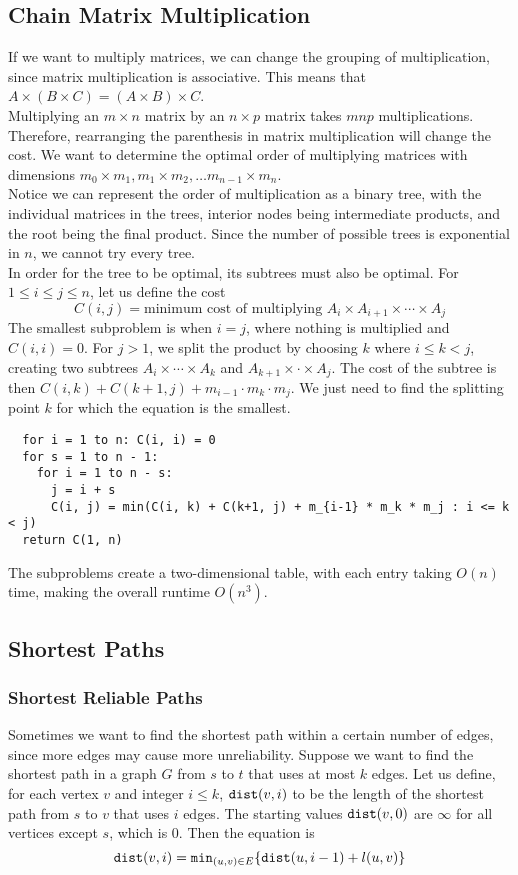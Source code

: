 \subsection{Chain Matrix Multiplication}
If we want to multiply matrices, we can change the grouping of multiplication, since matrix multiplication is associative.
This means that $A \times (B \times C) = (A \times B) \times C$.\\
Multiplying an $m \times n$ matrix by an $n \times p$ matrix takes $mnp$ multiplications.
Therefore, rearranging the parenthesis in matrix multiplication will change the cost.
We want to determine the optimal order of multiplying matrices with dimensions $m_{0} \times m_{1}, m_{1} \times m_{2},\ldots  m_{n-1} \times m_n$.\\
Notice we can represent the order of multiplication as a binary tree, with the individual matrices in the trees, interior nodes being intermediate products, and the root being the final product.
Since the number of possible trees is exponential in $n$, we cannot try every tree.\\
In order for the tree to be optimal, its subtrees must also be optimal.
For $1 \leq i \leq j \leq n$, let us define the cost $$C(i, j) = \text{minimum cost of multiplying $A_i \times A_{i+1} \times \cdots \times A_j$}$$
The smallest subproblem is when $i = j$, where nothing is multiplied and $C(i, i) = 0$.
For $j > 1$, we split the product by choosing $k$ where $i \leq k < j$, creating two subtrees $A_i \times \cdots \times A_k$ and $A_{k+1} \times \cdot \times A_j$.
The cost of the subtree is then $C(i, k) + C(k+1, j) + m_{i-1} \cdot m_k \cdot m_j$.
We just need to find the splitting point $k$ for which the equation is the smallest.
\begin{verbatim}
  for i = 1 to n: C(i, i) = 0
  for s = 1 to n - 1:
    for i = 1 to n - s:
      j = i + s
      C(i, j) = min(C(i, k) + C(k+1, j) + m_{i-1} * m_k * m_j : i <= k < j)
  return C(1, n)
\end{verbatim}
The subproblems create a two-dimensional table, with each entry taking $O(n)$ time, making the overall runtime $O(n^3)$.

\subsection{Shortest Paths}
\subsubsection{Shortest Reliable Paths}
Sometimes we want to find the shortest path within a certain number of edges, since more edges may cause more unreliability.
Suppose we want to find the shortest path in a graph $G$ from $s$ to $t$ that uses at most $k$ edges.
Let us define, for each vertex $v$ and integer $i \leq k$, $\verb|dist|(v, i)$ to be the length of the shortest path from $s$ to $v$ that uses $i$ edges.
The starting values $\verb|dist|(v, 0)$ are $\infty$ for all vertices except $s$, which is $0$.
Then the equation is $$\verb|dist|(v, i) = \verb|min|_{(u, v) \in E} \{\verb|dist|(u, i - 1) + l(u, v)\} $$

